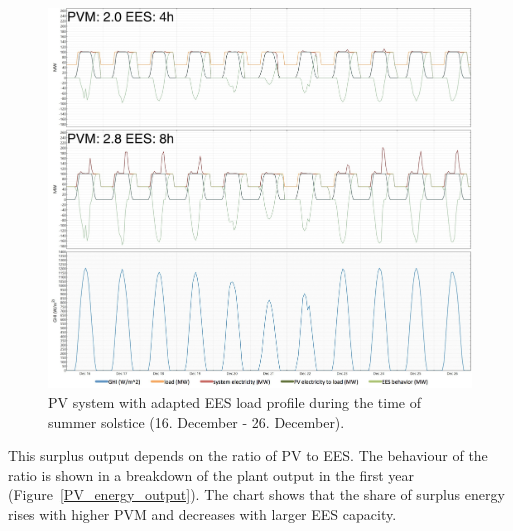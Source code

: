 \begin{figure}[htbp]
\centering
\includegraphics[width=1\linewidth]{FIG/PV_summer_load}
\caption[PV system with adapted EES load profile during the time of summer solstice.]{PV system with adapted EES load profile during the time of summer solstice (16. December - 26. December).}\label{PV_summer_load}
\end{figure}

This surplus output depends on the ratio of \ac{PV} to \ac{EES}. The behaviour of the ratio is shown in a breakdown of the plant output in the first year (Figure~\ref{PV_energy_output}). The chart shows that the share of surplus energy rises with higher \ac{PVM} and decreases with larger \ac{EES} capacity.


